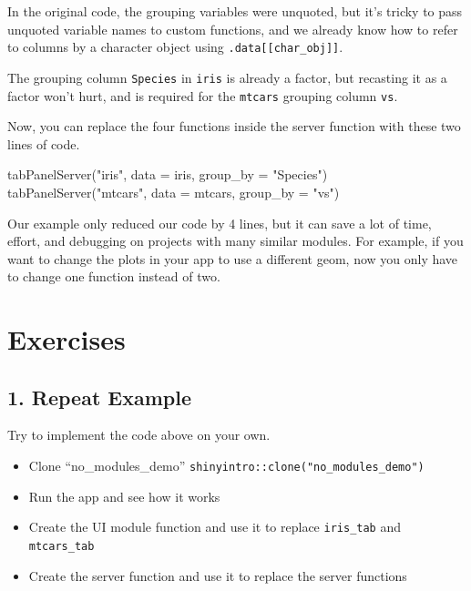 \documentclass[
]{book}
\newenvironment{Shaded}{\begin{snugshade}}{\end{snugshade}}
\newcommand{\AttributeTok}[1]{\textcolor[rgb]{0.77,0.63,0.00}{#1}}
\newcommand{\FunctionTok}[1]{\textcolor[rgb]{0.00,0.00,0.00}{#1}}
\newcommand{\NormalTok}[1]{#1}
\newcommand{\StringTok}[1]{\textcolor[rgb]{0.31,0.60,0.02}{#1}}
\providecommand{\tightlist}{%
  \setlength{\itemsep}{0pt}\setlength{\parskip}{0pt}}
\begin{document}
In the original code, the grouping variables were unquoted, but it's tricky to pass unquoted variable names to custom functions, and we already know how to refer to columns by a character object using \texttt{.data{[}{[}char\_obj{]}{]}}.

The grouping column \texttt{Species} in \texttt{iris} is already a factor, but recasting it as a factor won't hurt, and is required for the \texttt{mtcars} grouping column \texttt{vs}.

Now, you can replace the four functions inside the server function with these two lines of code.

\begin{Shaded}
\begin{Highlighting}[]
\FunctionTok{tabPanelServer}\NormalTok{(}\StringTok{"iris"}\NormalTok{, }\AttributeTok{data =}\NormalTok{ iris, }\AttributeTok{group\_by =} \StringTok{"Species"}\NormalTok{)}
\FunctionTok{tabPanelServer}\NormalTok{(}\StringTok{"mtcars"}\NormalTok{, }\AttributeTok{data =}\NormalTok{ mtcars, }\AttributeTok{group\_by =} \StringTok{"vs"}\NormalTok{)}
\end{Highlighting}
\end{Shaded}

Our example only reduced our code by 4 lines, but it can save a lot of time, effort, and debugging on projects with many similar modules. For example, if you want to change the plots in your app to use a different geom, now you only have to change one function instead of two.

\hypertarget{exercises-modules}{%
\section{Exercises}\label{exercises-modules}}

\hypertarget{repeat-example}{%
\subsection{1. Repeat Example}\label{repeat-example}}

Try to implement the code above on your own.

\begin{itemize}
\tightlist
\item
  Clone ``no\_modules\_demo'' \texttt{shinyintro::clone("no\_modules\_demo")}
\item
  Run the app and see how it works
\item
  Create the UI module function and use it to replace \texttt{iris\_tab} and \texttt{mtcars\_tab}
\item
  Create the server function and use it to replace the server functions
\end{itemize}
\end{document}
